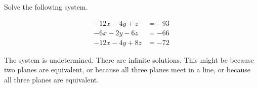 
\begin{question}
Solve the following system.

\[\begin{align}
- 12 x - 4 y + z&=-93\\
- 6 x - 2 y - 6 z&=-66\\
- 12 x - 4 y + 8 z&=-72
\end{align}\]
\begin{answerlist}
  \item 
  \item 
  \item 
\end{answerlist}
\end{question}

\begin{solution}
The system is undetermined. There are infinite solutions. This might be
because two planes are equivalent, or because all three planes meet in a
line, or because all three planes are equivalent.
\end{solution}

